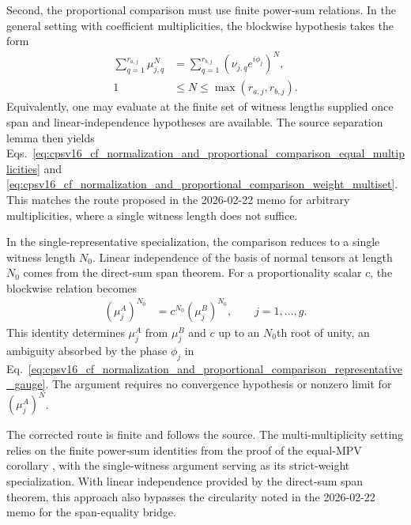 \documentclass{article}
\begin{document}
Second, the proportional comparison must use finite power-sum relations. In the
general setting with coefficient multiplicities, the blockwise hypothesis takes
the form
\begin{align}
    \sum_{q=1}^{r_{a,j}}\mu_{j,q}^N
        &= \sum_{q=1}^{r_{b,j}}
            (\nu_{j,q}e^{i\phi_j})^N,
    \label{eq:cpsv16_cf_normalization_and_proportional_comparison_corrected_finite_power_sum}\\
    1
        &\leq N
        \leq \max(r_{a,j},r_{b,j}).
    \label{eq:cpsv16_cf_normalization_and_proportional_comparison_finite_power_sum_range}
\end{align}
Equivalently, one may evaluate at the finite set of witness lengths supplied
once span and linear-independence hypotheses are available. The source
separation lemma then yields
Eqs.~\ref{eq:cpsv16_cf_normalization_and_proportional_comparison_equal_multiplicities}
and
\ref{eq:cpsv16_cf_normalization_and_proportional_comparison_weight_multiset}.
This matches the route proposed in the 2026-02-22 memo for arbitrary
multiplicities, where a single witness length does not suffice.

In the single-representative specialization, the comparison reduces to a single
witness length $N_0$. Linear independence of the
basis of normal tensors at length $N_0$ comes from the direct-sum span theorem.
For a proportionality scalar $c$, the blockwise relation becomes
\begin{align}
    (\mu_j^A)^{N_0}
        &= c^{N_0}(\mu_j^B)^{N_0},
        \qquad j=1,\ldots,g.
    \label{eq:cpsv16_cf_normalization_and_proportional_comparison_single_witness_weights}
\end{align}
This identity determines $\mu_j^A$ from $\mu_j^B$ and $c$ up to an $N_0$th
root of unity, an ambiguity absorbed by the phase $\phi_j$ in
Eq.~\ref{eq:cpsv16_cf_normalization_and_proportional_comparison_representative_gauge}.
The argument requires no convergence hypothesis or nonzero limit for
$(\mu_j^A)^N$.

The corrected route is finite and follows the source. The multi-multiplicity
setting relies on the finite power-sum identities from the proof of the
equal-MPV corollary \cite[Section~]{Cirac2016MPDO_arXiv}, with
the single-witness argument serving as its strict-weight specialization. With
linear independence provided by the direct-sum span theorem, this approach also
bypasses the circularity noted in the 2026-02-22 memo for the span-equality
bridge.
\end{document}
